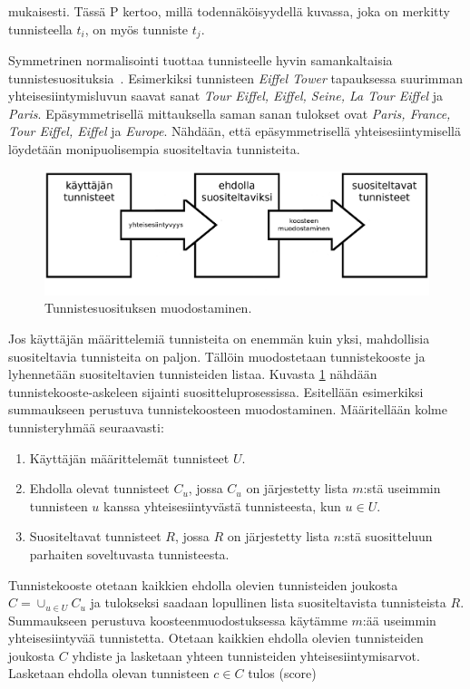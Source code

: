 \documentclass[12pt,finnish]{tktltiki2}
\theoremstyle{definition}
\theoremstyle{remark}
\begin{document}
mukaisesti. Tässä P kertoo, millä todennäköisyydellä kuvassa, joka on merkitty tunnisteella $t_{i}$, on myös tunniste $t_{j}$.

Symmetrinen normalisointi tuottaa tunnisteelle hyvin samankaltaisia tunnistesuosituksia~\cite{Sigurbjornsson:2008:FTR:1367497.1367542}. Esimerkiksi tunnisteen \textit{Eiffel Tower} tapauksessa suurimman yhteisesiintymisluvun saavat sanat \textit{Tour Eiffel, Eiffel, Seine, La Tour Eiffel} ja \textit{Paris}. Epäsymmetrisellä mittauksella saman sanan tulokset ovat \textit{Paris, France, Tour Eiffel, Eiffel} ja \textit{Europe}. Nähdään, että epäsymmetrisellä yhteisesiintymisellä löydetään monipuolisempia suositeltavia tunnisteita.

\begin{figure}[]
\includegraphics[width = 420pt]{tunnisteidensuosittelu.eps}\caption{Tunnistesuosituksen muodostaminen.}
\label{tunnisteidensuosittelu}
\end{figure}

Jos käyttäjän määrittelemiä tunnisteita on enemmän kuin yksi, mahdollisia suositeltavia tunnisteita on paljon. Tällöin muodostetaan tunnistekooste ja lyhennetään suositeltavien tunnisteiden listaa. Kuvasta \ref{tunnisteidensuosittelu} nähdään tunnistekooste-askeleen sijainti suositteluprosessissa.
Esitellään esimerkiksi summaukseen perustuva tunnistekoosteen muodostaminen. Määritellään kolme tunnisteryhmää seuraavasti:
\begin{enumerate}
\item Käyttäjän määrittelemät tunnisteet $U$.

\item Ehdolla olevat tunnisteet $C_{u}$, jossa $C_{u}$ on järjestetty lista $m$:stä useimmin tunnisteen $u$ kanssa yhteisesiintyvästä tunnisteesta, kun $u \in U$.

\item Suositeltavat tunnisteet $R$, jossa $R$ on järjestetty lista $n$:stä suositteluun parhaiten soveltuvasta tunnisteesta.
\end{enumerate}


Tunnistekooste otetaan kaikkien ehdolla olevien tunnisteiden joukosta $C = \cup_{u\in U}C_u$ ja tulokseksi saadaan lopullinen lista suositeltavista tunnisteista $R$. Summaukseen perustuva koosteenmuodostuksessa käytämme $m$:ää useimmin yhteisesiintyvää tunnistetta. Otetaan kaikkien ehdolla olevien tunnisteiden joukosta $C$ yhdiste ja lasketaan yhteen tunnisteiden yhteisesiintymisarvot. Lasketaan ehdolla olevan tunnisteen $c \in C$ tulos (score)
\end{document}
